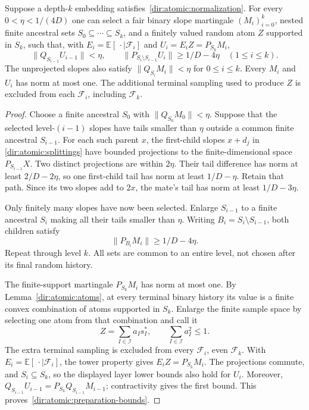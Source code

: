 \begin{lemma}
\label{dir:atomic:preparation}
Suppose a depth-$k$ embedding satisfies~\eqref{dir:atomic:normalization}.
For every $0<\eta<1/(4D)$ one can select a fair binary slope martingale
$(M_i)_{i=0}^k$, nested finite ancestral sets $S_0\subseteq\cdots\subseteq S_k$,
and a finitely valued random atom $Z$ supported in $S_k$, such that, with
$E_i=\mathbb E[\,\cdot\mid\mathcal F_i]$ and $U_i=E_iZ=P_{S_k}M_i$,
\begin{equation}\label{dir:atomic:preparation-bounds}
 \|Q_{S_{i-1}}U_{i-1}\|<\eta,\qquad
 \|P_{S_i\setminus S_{i-1}}U_i\|\ge1/D-4\eta
 \quad(1\le i\le k).
\end{equation}
The unprojected slopes also satisfy $\|Q_{S_i}M_i\|<\eta$ for
$0\le i\le k$. Every $M_i$ and $U_i$ has norm at most one. The additional terminal
sampling used to produce $Z$ is excluded from each $\mathcal F_i$,
including $\mathcal F_k$.
\end{lemma}
\begin{proof}
Choose a finite ancestral $S_0$ with $\|Q_{S_0}M_0\|<\eta$.
Suppose that the selected level-$(i-1)$ slopes have tails smaller than
$\eta$ outside a common finite ancestral $S_{i-1}$.  For each such parent
$x$, the first-child slopes $x+d_j$ in \eqref{dir:atomic:splittings} have
bounded projections to the finite-dimensional space $P_{S_{i-1}}X$.
Two distinct projections are within $2\eta$.  Their tail difference has
norm at least $2/D-2\eta$, so one first-child tail has norm at least
$1/D-\eta$.  Retain that path.  Since its two slopes add to $2x$, the
mate's tail has norm at least $1/D-3\eta$.

Only finitely many slopes have now been selected.  Enlarge $S_{i-1}$ to a
finite ancestral $S_i$ making all their tails smaller than $\eta$.
Writing $B_i=S_i\setminus S_{i-1}$, both children satisfy
\[
 \|P_{B_i}M_i\|\ge1/D-4\eta.
\]
Repeat through level $k$.  All sets are common to an entire level, not
chosen after its final random history.

The finite-support martingale $P_{S_k}M_i$ has norm at most one.
By Lemma~\ref{dir:atomic:atoms}, at every terminal binary history its value
is a finite convex combination of atoms supported in $S_k$.  Enlarge the
finite sample space by selecting one atom from that combination and call
it
\[
 Z=\sum_{I\in\mathcal I}a_I s_I^*,\qquad \sum_{I\in\mathcal I}a_I^2\le1.
\]
The extra terminal sampling is excluded from every $\mathcal F_i$, even
$\mathcal F_k$.  With $E_i=\mathbb E[\,\cdot\mid\mathcal F_i]$, the tower
property gives $E_iZ=P_{S_k}M_i$. The projections commute, and
$S_i\subseteq S_k$, so the displayed
layer lower bounds also hold for $U_i$. Moreover,
$Q_{S_{i-1}}U_{i-1}=P_{S_k}Q_{S_{i-1}}M_{i-1}$; contractivity gives
the first bound. This proves~\eqref{dir:atomic:preparation-bounds}.
\end{proof}

